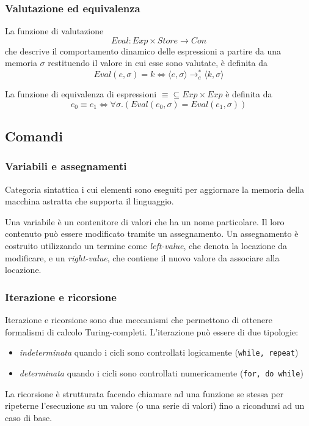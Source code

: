 \documentclass[a4paper, 10pt]{article}
\begin{document}
	\subsubsection{Valutazione ed equivalenza}
	La funzione di valutazione 
	\[
	Eval:Exp \times Store \to Con
	\]
	che descrive il comportamento dinamico delle espressioni a partire da una memoria $\sigma$ restituendo il valore in cui esse sono valutate, è definita da 
	\[
	Eval(e, \sigma)=k \iff \langle e, \sigma \rangle \to_e^* \langle k, \sigma \rangle
	\]
	
	La funzione di equivalenza di espressioni $\equiv \subseteq Exp \times Exp$ è definita da 
	\[
	e_0 \equiv e_1 \iff \forall \sigma.(Eval(e_0,\sigma)=Eval(e_1, \sigma))
	\]
	
	\subsection{Comandi}
	\subsubsection{Variabili e assegnamenti}
	Categoria sintattica i cui elementi sono eseguiti per aggiornare la memoria della macchina astratta che supporta il linguaggio.
	
	\noindent
	Una variabile è un contenitore di valori che ha un nome particolare. Il loro contenuto può essere modificato tramite un assegnamento. Un assegnamento è costruito utilizzando un termine come \textit{left-value}, che denota la locazione da modificare, e un \textit{right-value}, che contiene il nuovo valore da associare alla locazione.
	
	\subsubsection{Iterazione e ricorsione}
	Iterazione e ricorsione sono due meccanismi che permettono di ottenere formalismi di calcolo Turing-completi.
	L'iterazione può essere di due tipologie:
	\begin{itemize}
		\item \textit{indeterminata} quando i cicli sono controllati logicamente (\verb|while, repeat|)
		\item \textit{determinata} quando i cicli sono controllati numericamente (\verb|for, do while|)
	\end{itemize}
	
	La ricorsione è strutturata facendo chiamare ad una funzione se stessa per ripeterne l'esecuzione su un valore (o una serie di valori) fino a ricondursi ad un caso di base.
	
\end{document}
